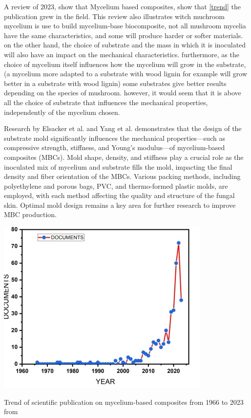 A review of 2023,\cite{alaneme2023mycelium} show that Mycelium based composites, show that \ref{trend} the publication grew in the field.
This review also illustrates witch muchroom mycelium is use to build mycelium-base biocomposite, not all mushroom mycelia have the same characteristics, and some will produce harder or softer materials. on the other hand, the choice of substrate and the mass in which it is inoculated will also have an impact on the mechanical characteristics. furthermore, as the choice of mycelium itself influences how the mycelium will grow in the substrate, (a mycelium more adapted to a substrate with wood lignin for example will grow better in a substrate with wood lignin) some substrates give better results depending on the species of mushroom. 
however, it would seem that it is above all the choice of substrate that influences the mechanical properties, independently of the mycelium chosen.  

Research by Elsacker et al.\cite{elsacker2019mechanical} and Yang et al.\cite{yang2017physical} demonstrates that the design of the substrate mold significantly influences the mechanical properties—such as compressive strength, stiffness, and Young’s modulus—of mycelium-based composites (MBCs). Mold shape, density, and stiffness play a crucial role as the inoculated mix of mycelium and substrate fills the mold, impacting the final density and fiber orientation of the MBCs. Various packing methods, including polyethylene and porous bags, PVC, and thermo-formed plastic molds, are employed, with each method affecting the quality and structure of the fungal skin. Optimal mold design remains a key area for further research to improve MBC production.

\begin{marginfigure}
    \centering
    \includegraphics{images/publication on mycelium-based.png}    
    \caption{Trend of scientific publication on mycelium-based composites from 1966 to 2023 from \cite{alaneme2023mycelium}}
    \label{fig:trend}
\end{marginfigure}



